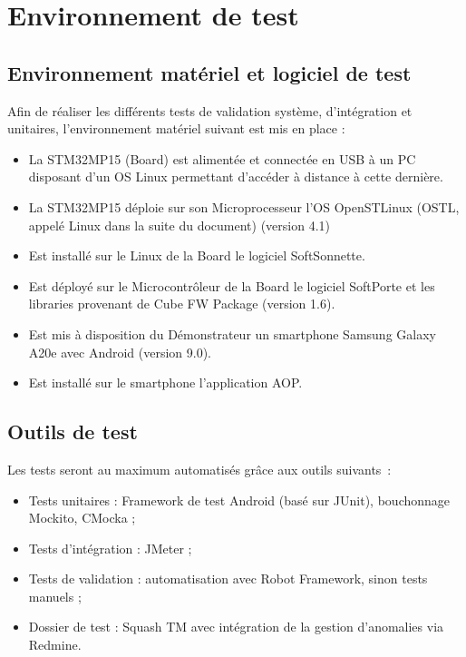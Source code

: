 
\section{Environnement de test}
\label{sec:env}

\subsection{Environnement matériel et logiciel de test}
\label{sec:env:env}





Afin de réaliser les différents tests de validation système, d'intégration et unitaires, l'environnement matériel suivant est mis en place :

\begin{itemize}
    \item La STM32MP15 (Board) est alimentée et connectée en USB à un PC disposant d'un OS Linux permettant d'accéder à distance à cette dernière.
    \item La STM32MP15 déploie sur son Microprocesseur l'OS OpenSTLinux (OSTL, appelé Linux dans la suite du document) (version 4.1)
    \item Est installé sur le Linux de la Board le logiciel SoftSonnette.
    \item Est déployé sur le Microcontrôleur de la Board le logiciel SoftPorte et les libraries provenant de Cube FW Package (version 1.6).
    \item Est mis à disposition du Démonstrateur un smartphone Samsung Galaxy A20e avec Android (version 9.0).
    \item Est installé sur le smartphone l'application AOP.
\end{itemize}

\subsection{Outils de test}
\label{sec:env:outils}

Les tests seront au maximum automatisés grâce aux outils suivants~:
\begin{itemize}
    \item Tests unitaires : Framework de test Android (basé sur JUnit), bouchonnage Mockito, CMocka ;
    \item Tests d'intégration : JMeter ;
    \item Tests de validation : automatisation avec Robot Framework, sinon tests manuels ;
    \item Dossier de test : Squash TM avec intégration de la gestion d'anomalies via Redmine.
\end{itemize}



